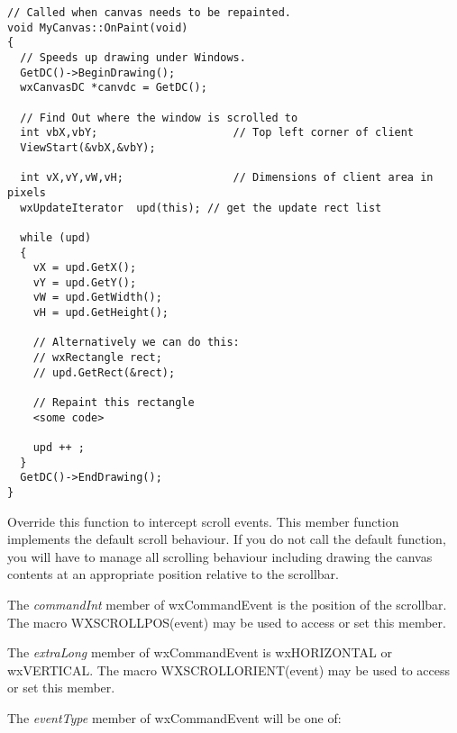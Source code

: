 \begin{verbatim}
// Called when canvas needs to be repainted.
void MyCanvas::OnPaint(void)
{
  // Speeds up drawing under Windows.
  GetDC()->BeginDrawing();
  wxCanvasDC *canvdc = GetDC();

  // Find Out where the window is scrolled to
  int vbX,vbY;                     // Top left corner of client
  ViewStart(&vbX,&vbY);

  int vX,vY,vW,vH;                 // Dimensions of client area in pixels
  wxUpdateIterator	upd(this); // get the update rect list

  while (upd)
  {
    vX = upd.GetX();
    vY = upd.GetY();
    vW = upd.GetWidth();
    vH = upd.GetHeight();

    // Alternatively we can do this:
    // wxRectangle rect;
    // upd.GetRect(&rect);

    // Repaint this rectangle
    <some code>

    upd ++ ;
  }
  GetDC()->EndDrawing();
}
\end{verbatim}

\label{wxcanvasonscroll}


Override this function to intercept scroll events. This
member function implements the default scroll behaviour. If
you do not call the default function, you will have to manage
all scrolling behaviour including drawing the canvas contents
at an appropriate position relative to the scrollbar.

The {\it commandInt} member of wxCommandEvent is the
position of the scrollbar. The macro WXSCROLLPOS(event) may
be used to access or set this member.

The {\it extraLong} member of wxCommandEvent is wxHORIZONTAL
or wxVERTICAL. The macro WXSCROLLORIENT(event) may be used
to access or set this member.

The {\it eventType} member of wxCommandEvent will be one of:

\begin{twocollist}\itemsep=0pt
\end{twocollist}

